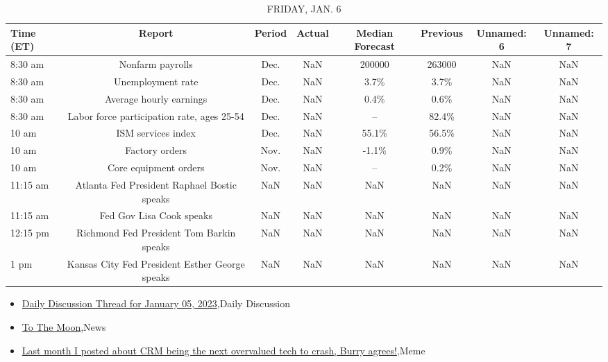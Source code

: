\documentclass{article}%
\begin{document}
\begin{table}[htbp]%
\caption{FRIDAY, JAN. 6}%
\centering%
\begin{adjustbox}{width=1\textwidth}%
\begin{tabular}{lccccccc}
\toprule
Time (ET) &                                         Report & Period & Actual & Median Forecast & Previous & Unnamed: 6 & Unnamed: 7 \\
\midrule
  8:30 am &                               Nonfarm payrolls &   Dec. &    NaN &          200000 &   263000 &        NaN &        NaN \\
  8:30 am &                              Unemployment rate &   Dec. &    NaN &            3.7\% &     3.7\% &        NaN &        NaN \\
  8:30 am &                        Average hourly earnings &   Dec. &    NaN &            0.4\% &     0.6\% &        NaN &        NaN \\
  8:30 am &     Labor force participation rate, ages 25-54 &   Dec. &    NaN &              -- &    82.4\% &        NaN &        NaN \\
    10 am &                             ISM services index &   Dec. &    NaN &           55.1\% &    56.5\% &        NaN &        NaN \\
    10 am &                                 Factory orders &   Nov. &    NaN &           -1.1\% &     0.9\% &        NaN &        NaN \\
    10 am &                          Core equipment orders &   Nov. &    NaN &              -- &     0.2\% &        NaN &        NaN \\
 11:15 am &    Atlanta Fed President Raphael Bostic speaks &    NaN &    NaN &             NaN &      NaN &        NaN &        NaN \\
 11:15 am &                       Fed Gov Lisa Cook speaks &    NaN &    NaN &             NaN &      NaN &        NaN &        NaN \\
 12:15 pm &       Richmond Fed President Tom Barkin speaks &    NaN &    NaN &             NaN &      NaN &        NaN &        NaN \\
     1 pm & Kansas City Fed President Esther George speaks &    NaN &    NaN &             NaN &      NaN &        NaN &        NaN \\
\bottomrule
\end{tabular}
%
\end{adjustbox}%
\end{table}

%
\begin{itemize}%
\item%
\href{https://reddit.com/r/wallstreetbets/comments/103w8ct/daily\_discussion\_thread\_for\_january\_05\_2023/}{Daily Discussion Thread for January 05, 2023},Daily Discussion%
\item%
\href{https://reddit.com/r/wallstreetbets/comments/103v2iq/to\_the\_moon/}{To The Moon},News%
\item%
\href{https://reddit.com/r/wallstreetbets/comments/103tby2/last\_month\_i\_posted\_about\_crm\_being\_the\_next/}{Last month I posted about CRM being the next overvalued tech to crash, Burry agrees!},Meme%
\end{itemize}%
\end{document}
